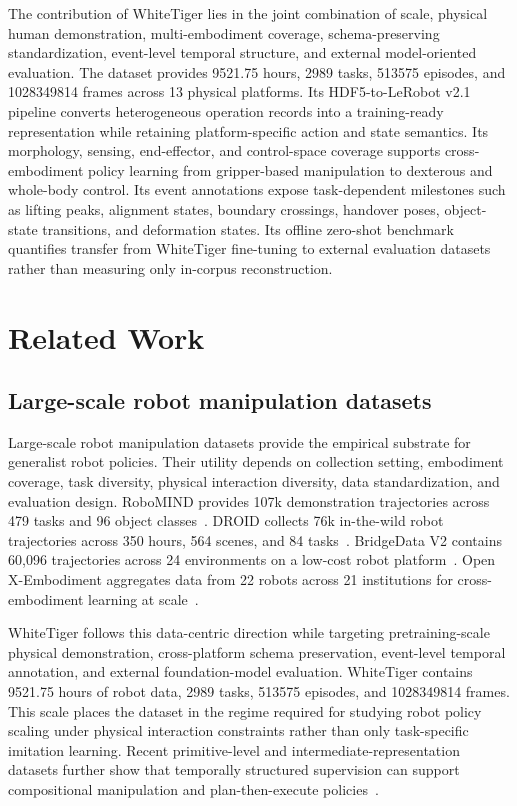 The contribution of WhiteTiger lies in the joint combination of scale, physical human demonstration, multi-embodiment coverage, schema-preserving standardization, event-level temporal structure, and external model-oriented evaluation. The dataset provides 9521.75 hours, 2989 tasks, 513575 episodes, and 1028349814 frames across 13 physical platforms. Its HDF5-to-LeRobot v2.1 pipeline converts heterogeneous operation records into a training-ready representation while retaining platform-specific action and state semantics. Its morphology, sensing, end-effector, and control-space coverage supports cross-embodiment policy learning from gripper-based manipulation to dexterous and whole-body control. Its event annotations expose task-dependent milestones such as lifting peaks, alignment states, boundary crossings, handover poses, object-state transitions, and deformation states. Its offline zero-shot benchmark quantifies transfer from WhiteTiger fine-tuning to external evaluation datasets rather than measuring only in-corpus reconstruction.

\section{Related Work}

\subsection{Large-scale robot manipulation datasets}

Large-scale robot manipulation datasets provide the empirical substrate for generalist robot policies. Their utility depends on collection setting, embodiment coverage, task diversity, physical interaction diversity, data standardization, and evaluation design. RoboMIND provides 107k demonstration trajectories across 479 tasks and 96 object classes~\cite{wu2024robomind}. DROID collects 76k in-the-wild robot trajectories across 350 hours, 564 scenes, and 84 tasks~\cite{khazatsky2024droid}. BridgeData V2 contains 60,096 trajectories across 24 environments on a low-cost robot platform~\cite{walke2023bridgedatav2}. Open X-Embodiment aggregates data from 22 robots across 21 institutions for cross-embodiment learning at scale~\cite{oneill2023openx}.

WhiteTiger follows this data-centric direction while targeting pretraining-scale physical demonstration, cross-platform schema preservation, event-level temporal annotation, and external foundation-model evaluation. WhiteTiger contains 9521.75 hours of robot data, 2989 tasks, 513575 episodes, and 1028349814 frames. This scale places the dataset in the regime required for studying robot policy scaling under physical interaction constraints rather than only task-specific imitation learning. Recent primitive-level and intermediate-representation datasets further show that temporally structured supervision can support compositional manipulation and plan-then-execute policies~\cite{chen2024rh20tp,li2026robointer,stanovcic2026atlas}.

